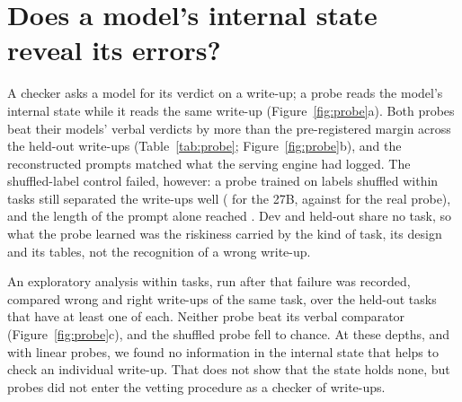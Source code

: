 \section{Does a model's internal state reveal its errors?}
\label{sec:results-probe}

A checker asks a model for its verdict on a write-up; a probe reads the model's internal state while it reads the same write-up (Figure~\ref{fig:probe}a). Both probes beat their models' verbal verdicts by more than the pre-registered margin across the held-out write-ups (Table~\ref{tab:probe}; Figure~\ref{fig:probe}b), and the reconstructed prompts matched what the serving engine had logged. The shuffled-label control failed, however: a probe trained on labels shuffled within tasks still separated the write-ups well ( for the 27B, against  for the real probe), and the length of the prompt alone reached . Dev and held-out share no task, so what the probe learned was the riskiness carried by the kind of task, its design and its tables, not the recognition of a wrong write-up.

An exploratory analysis within tasks, run after that failure was recorded, compared wrong and right write-ups of the same task, over the  held-out tasks that have at least one of each. Neither probe beat its verbal comparator (Figure~\ref{fig:probe}c), and the shuffled probe fell to chance. At these depths, and with linear probes, we found no information in the internal state that helps to check an individual write-up. That does not show that the state holds none, but probes did not enter the vetting procedure as a checker of write-ups.

